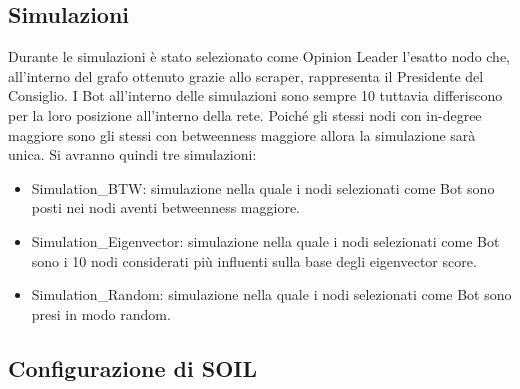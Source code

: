     \subsection{Simulazioni}
    Durante le simulazioni è stato selezionato come Opinion Leader l’esatto nodo che, all’interno del grafo ottenuto grazie allo scraper, rappresenta il Presidente del Consiglio. I Bot all’interno delle simulazioni sono sempre 10 tuttavia differiscono per la loro posizione all’interno della rete. Poiché gli stessi nodi con in-degree maggiore sono gli stessi con betweenness maggiore allora la simulazione sarà unica. Si avranno quindi tre simulazioni:
    \begin{itemize}
    \item Simulation\_BTW: simulazione nella quale i nodi selezionati come Bot sono posti nei nodi aventi betweenness maggiore.
    \item Simulation\_Eigenvector: simulazione nella quale i nodi selezionati come Bot sono i 10 nodi considerati più influenti sulla base degli eigenvector score.
    \item Simulation\_Random: simulazione nella quale i nodi selezionati come Bot sono presi in modo random.
    \end{itemize}
    \subsection{Configurazione di SOIL}\label{ConfigSoil}

